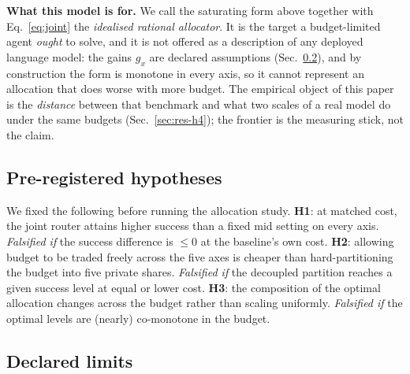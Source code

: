 \documentclass[10pt]{article} %
\begin{document}
\textbf{What this model is for.} We call the saturating form above together with
Eq.~\eqref{eq:joint} the \emph{idealised rational allocator}. It is the target a
budget-limited agent \emph{ought} to solve, and it is not offered as a description of any
deployed language model: the gains $g_x$ are declared assumptions (Sec.~\ref{sec:limits}),
and by construction the form is monotone in every axis, so it cannot represent an allocation
that does worse with more budget. The empirical object of this paper is the \emph{distance}
between that benchmark and what two scales of a real model do under the same budgets
(Sec.~\ref{sec:res-h4}); the frontier is the measuring stick, not the claim.

\subsection{Pre-registered hypotheses}
\label{sec:pre-registration}

We fixed the following before running the allocation study. \textbf{H1}: at
matched cost, the joint router attains higher success than a fixed mid setting on
every axis. \emph{Falsified if} the success difference is $\leq 0$ at the
baseline's own cost. \textbf{H2}: allowing budget to be traded freely across the
five axes is cheaper than hard-partitioning the budget into five private shares.
\emph{Falsified if} the decoupled partition reaches a given success level at equal
or lower cost. \textbf{H3}: the composition of the optimal allocation changes
across the budget rather than scaling uniformly. \emph{Falsified if} the optimal
levels are (nearly) co-monotone in the budget.

\subsection{Declared limits}
\label{sec:limits}
\end{document}
